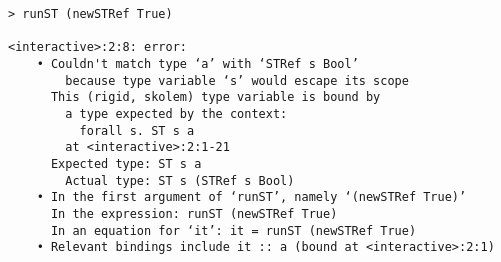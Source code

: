 \begin{repl}\begin{lstlisting}
> runST (newSTRef True)

<interactive>:2:8: error:
    • Couldn't match type ‘a’ with ‘STRef s Bool’
        because type variable ‘s’ would escape its scope
      This (rigid, skolem) type variable is bound by
        a type expected by the context:
          forall s. ST s a
        at <interactive>:2:1-21
      Expected type: ST s a
        Actual type: ST s (STRef s Bool)
    • In the first argument of ‘runST’, namely ‘(newSTRef True)’
      In the expression: runST (newSTRef True)
      In an equation for ‘it’: it = runST (newSTRef True)
    • Relevant bindings include it :: a (bound at <interactive>:2:1)\end{lstlisting}\end{repl}
